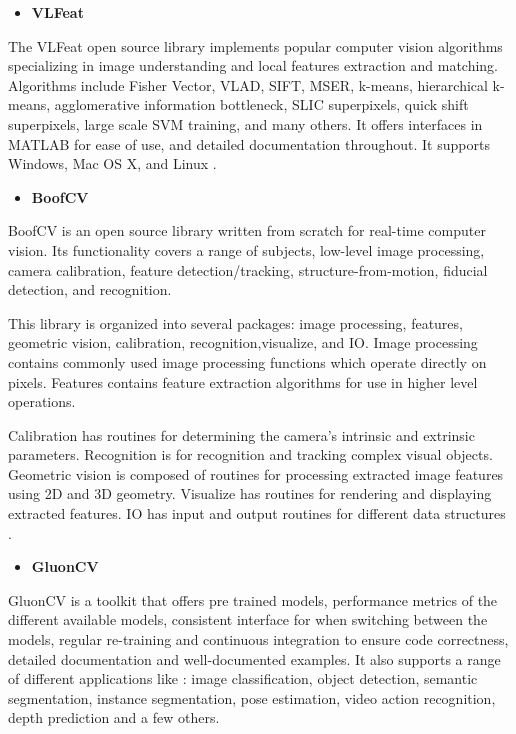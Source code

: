     \begin{itemize}
        \item \textbf{VLFeat}
    \end{itemize}

    The VLFeat open source library implements popular computer vision algorithms specializing in image understanding and local features extraction and matching. Algorithms include Fisher Vector, VLAD, SIFT, MSER, k-means, hierarchical k-means, agglomerative information bottleneck, SLIC superpixels, quick shift superpixels, large scale SVM training, and many others. It offers interfaces in MATLAB for ease of use, and detailed documentation throughout. It supports Windows, Mac OS X, and Linux \cite{vedaldi08vlfeat}.

    \begin{itemize}
        \item \textbf{BoofCV}
    \end{itemize}

    BoofCV is an open source library written from scratch for real-time computer vision. Its functionality covers a range of subjects, low-level image processing, camera calibration, feature detection/tracking, structure-from-motion, fiducial detection, and recognition. \par
	This library is organized into several packages: image processing, features, geometric vision, calibration, recognition,visualize, and IO. Image processing contains commonly used image processing functions which operate directly on pixels. Features contains feature extraction algorithms for use in higher level operations. \par Calibration has routines for determining the camera's intrinsic and extrinsic parameters. Recognition is for recognition and tracking complex visual objects. Geometric vision is composed of routines for processing extracted image features using 2D and 3D geometry. Visualize has routines for rendering and displaying extracted features. IO has input and output routines for different data structures \cite{boofcvweb}.

    \begin{itemize}
        \item \textbf{GluonCV}
    \end{itemize}

    GluonCV is a toolkit that offers pre trained models, performance metrics of the different available models, consistent interface for when switching between the models, regular re-training and continuous integration to ensure code correctness, detailed documentation and well-documented examples. It also supports a range of different applications like : image classification, object detection, semantic segmentation, instance segmentation, pose estimation, video action recognition, depth prediction and a few others.

